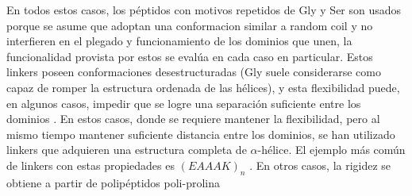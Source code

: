 

En todos estos casos, los péptidos con motivos repetidos de Gly y Ser son usados porque se asume que adoptan una conformacion similar a random coil y no interfieren en el plegado y funcionamiento de los dominios que unen,
la funcionalidad provista por estos se evalúa en cada caso en particular.
Estos linkers poseen conformaciones desestructuradas (Gly suele considerarse como capaz de romper la estructura ordenada de las hélices), y esta flexibilidad puede, en algunos casos, impedir que se logre una separación 
suficiente entre los dominios \cite{evers2006quantitative}.
En estos casos, donde se requiere mantener la flexibilidad, pero al mismo tiempo mantener suficiente distancia entre los dominios, se han utilizado linkers que adquieren una estructura completa de $\alpha$-hélice.
El ejemplo más común de linkers con estas propiedades es $(EAAAK)_n$ \cite{arai2001design}. 
En otros casos, la rigidez se obtiene a partir de polipéptidos poli-prolina \cite{schuler2005polyproline}




% 







